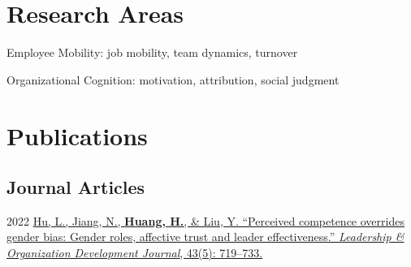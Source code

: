 \documentclass[11pt,letterpaper]{report} %
\newcommand{\listitemspace}{0.25em}
\renewenvironment{itemize}
{\begin{list}{}{\setlength{\leftmargin}{0em}
                \setlength{\parskip}{0em}
                \setlength{\itemsep}{\listitemspace}
                \setlength{\parsep}{\listitemspace}}}
{\end{list}}
\begin{document}






    \section*{Research Areas}

    \begin{itemize}

        \item Employee Mobility: job mobility, team dynamics, turnover
        \item Organizational Cognition: motivation, attribution, social judgment

    \end{itemize}



    \section*{Publications}

    \subsection*{Journal Articles}

    \begin{tablist}

        \item[2022] \tab{}\href{https://doi.org/10.1108/LODJ-06-2021-0312}{Hu, L., Jiang, N., \textbf{Huang, H.}, \& Liu, Y. \enquote{Perceived competence overrides gender bias: Gender roles, affective trust and leader effectiveness.} \textit{Leadership \& Organization Development Journal}, 43(5): 719--733. }

    \end{tablist}
\end{document}
